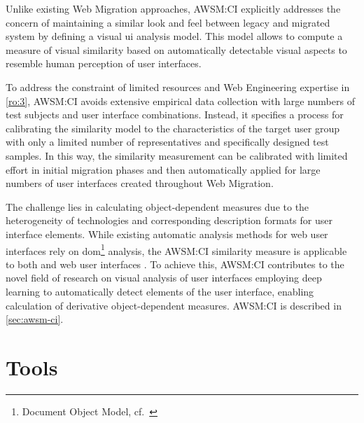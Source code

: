 \par\smallskip
Unlike existing \gls{Web Migration} approaches, AWSM:CI explicitly addresses the concern of maintaining a similar look and feel between legacy and migrated system by defining a visual \gls{ui} analysis model.
This model allows to compute a measure of visual similarity based on automatically detectable visual aspects to resemble human perception of user interfaces.

To address the constraint of limited resources and \gls{Web Engineering} expertise in \cref{ro:3}, AWSM:CI avoids extensive empirical data collection with large numbers of test subjects and user interface combinations.
Instead, it specifies a process for calibrating the similarity model to the characteristics of the target user group with only a limited number of representatives and specifically designed test samples.
In this way, the similarity measurement can be calibrated with limited effort in initial migration phases and then automatically applied for large numbers of user interfaces created throughout \gls{Web Migration}.

The challenge lies in calculating object-dependent measures due to the heterogeneity of technologies and corresponding description formats for user interface elements.
While existing automatic analysis methods for \gls{web} user interfaces rely on \gls{dom}\footnote{Document Object Model, cf.~\autocite{W3C2015DOM}} analysis, the AWSM:CI similarity measure is applicable to both  and \gls{web} user interfaces \autocite{Heil2016Similarity}.
To achieve this, AWSM:CI contributes to the novel field of research on visual analysis of user interfaces employing deep learning to automatically detect elements of the user interface, enabling calculation of derivative object-dependent measures.
AWSM:CI is described in \cref{sec:awsm-ci}.

\vspace{-13pt}
\hypertarget{sec:platform}{%
\section{Tools}\label{sec:platform}}
\vspace{12pt}


